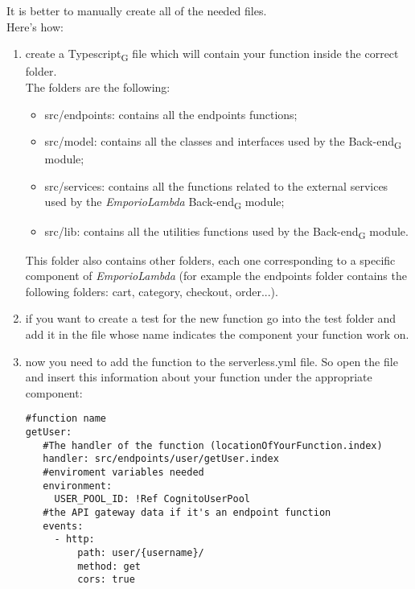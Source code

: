 It is better to manually create all of the needed files.\\
Here's how:
\begin{enumerate}
\item create a Typescript\textsubscript{G} file which will contain your function inside the correct folder.\\The folders are the following:
\begin{itemize}
\item src/endpoints: contains all the endpoints functions;
\item src/model: contains all the classes and interfaces used by the Back-end\textsubscript{G} module;
\item src/services: contains all the functions related to the external services used by the \textit{EmporioLambda} Back-end\textsubscript{G} module;
\item src/lib: contains all the utilities functions used by the Back-end\textsubscript{G} module.
\end{itemize}
This folder also contains other folders, each one corresponding to a specific component of \textit{EmporioLambda} (for example the endpoints folder contains the following folders: cart, category, checkout, order...). 
\item if you want to create a test for the new function go into the test folder and add it in the file whose name indicates the component your function work on.
\item now you need to add the function to the serverless.yml file. So open the file and insert this information about your function under the appropriate component:
\begin{lstlisting}
#function name
getUser:
   #The handler of the function (locationOfYourFunction.index)
   handler: src/endpoints/user/getUser.index
   #enviroment variables needed
   environment:
     USER_POOL_ID: !Ref CognitoUserPool
   #the API gateway data if it's an endpoint function
   events:
     - http:
         path: user/{username}/
         method: get
         cors: true
\end{lstlisting}
\end{enumerate}